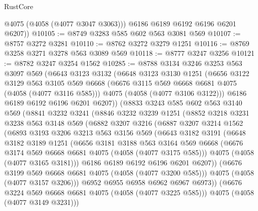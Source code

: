 \begin{lexlean}{RustCore}
\begin{coremodule}
          @4075
          (@4058 (@4077 @3047 @3063)))
        @6186
        @6189
        @6192
        @6196
        @6201
        @6207))
@10105 := @8749 @3283 @585 @602 @563 @3081 @569
@10107 := @8757 @3272 @3281
@10110 := @8762 @3272 @3279 @1251
@10116 := @8769 @3258 @3271 @3278 @563 @3089 @569
@10118 := @8777 @3247 @3256
@10121 := @8782 @3247 @3254 @1562
@10285 := @8788
    @3134
    @3246
    @3253
    @563
    @3097
    @569
    (@6643
      @3123
      @3132
      (@6648
        @3123
        @3130
        @1251
        (@6656
          @3122
          @3129
          @563
          @3105
          @569
          @6668
          (@6676 @3115 @569 @6668 @6681 @4075 (@4058 (@4077 @3116 @585)))
          @4075
          (@4058 (@4077 @3106 @3122)))
        @6186
        @6189
        @6192
        @6196
        @6201
        @6207))
    (@8833
      @3243
      @585
      @602
      @563
      @3140
      @569
      (@8841
        @3232
        @3241
        (@8846
          @3232
          @3239
          @1251
          (@8852
            @3218
            @3231
            @3238
            @563
            @3148
            @569
            (@6882
              @3207
              @3216
              (@6887
                @3207
                @3214
                @1562
                (@6893
                  @3193
                  @3206
                  @3213
                  @563
                  @3156
                  @569
                  (@6643
                    @3182
                    @3191
                    (@6648
                      @3182
                      @3189
                      @1251
                      (@6656
                        @3181
                        @3188
                        @563
                        @3164
                        @569
                        @6668
                        (@6676 @3174 @569 @6668 @6681 @4075 (@4058 (@4077 @3175 @585)))
                        @4075
                        (@4058 (@4077 @3165 @3181)))
                      @6186
                      @6189
                      @6192
                      @6196
                      @6201
                      @6207))
                  (@6676 @3199 @569 @6668 @6681 @4075 (@4058 (@4077 @3200 @585)))
                  @4075
                  (@4058 (@4077 @3157 @3206)))
                @6952
                @6955
                @6958
                @6962
                @6967
                @6973))
            (@6676 @3224 @569 @6668 @6681 @4075 (@4058 (@4077 @3225 @585)))
            @4075
            (@4058 (@4077 @3149 @3231)))

\end{coremodule}
\end{lexlean}
